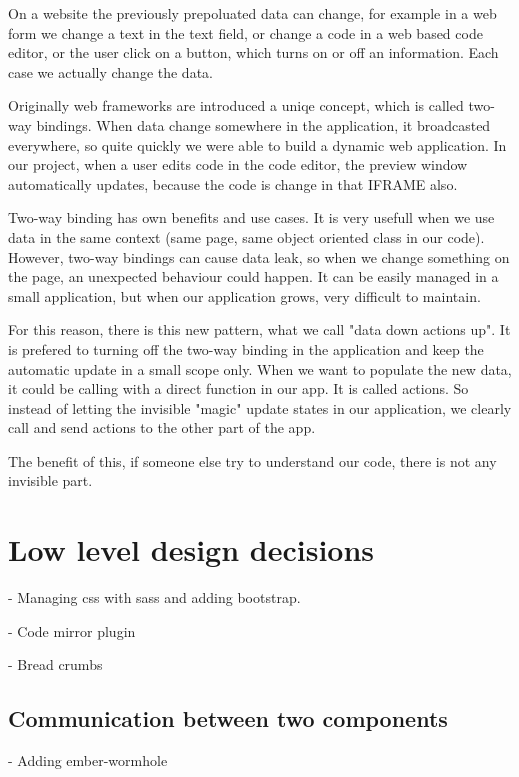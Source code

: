 \documentclass[12pt, a4paper, oneside, openright, medskipamount]{report}
\begin{document}
On a website the previously prepoluated data can change, for example in a web form we change a text in the text field, or change a code in a web based code editor, or the user click on a button, which turns on or off an information. Each case we actually change the data.

Originally web frameworks are introduced a uniqe concept, which is called two-way bindings. When data change somewhere in the application, it broadcasted everywhere, so quite quickly we were able to build a dynamic web application. In our project, when a user edits code in the code editor, the preview window automatically updates, because the code is change in that IFRAME also.

Two-way binding has own benefits and use cases. It is very usefull when we use data in the same context (same page, same object oriented class in our code). However, two-way bindings can cause data leak, so when we change something on the page, an unexpected behaviour could happen. It can be easily managed in a small application, but when our application grows, very difficult to maintain.

For this reason, there is this new pattern, what we call "data down actions up". It is prefered to turning off the two-way binding in the application and keep the automatic update in a small scope only. When we want to populate the new data, it could be calling with a direct function in our app. It is called actions. So instead of letting the invisible "magic" update states in our application, we clearly call and send actions to the other part of the app.

The benefit of this, if someone else try to understand our code, there is not any invisible part.

\section{Low level design decisions}

- Managing css with sass and adding bootstrap.

- Code mirror plugin

- Bread crumbs





\subsection{Communication between two components}

- Adding ember-wormhole
\end{document}
